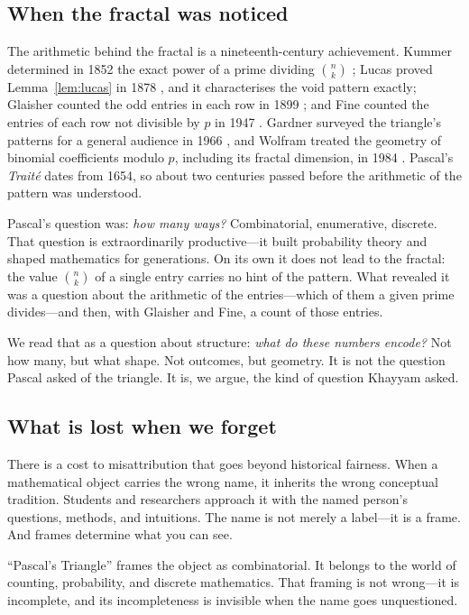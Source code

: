 \documentclass[11pt]{amsart}
\begin{document}
\subsection{When the fractal was noticed}

The arithmetic behind the fractal is a nineteenth-century achievement. Kummer determined in 1852 the exact power of a prime dividing $\binom{n}{k}$ \cite{kummer1852}; Lucas proved Lemma~\ref{lem:lucas} in 1878 \cite{lucas1878}, and it characterises the void pattern exactly; Glaisher counted the odd entries in each row in 1899 \cite{glaisher1899}; and Fine counted the entries of each row not divisible by $p$ in 1947 \cite{fine1947}. Gardner surveyed the triangle's patterns for a general audience in 1966 \cite{gardner1966}, and Wolfram treated the geometry of binomial coefficients modulo $p$, including its fractal dimension, in 1984 \cite{wolfram1984}. Pascal's \emph{Traité} dates from 1654, so about two centuries passed before the arithmetic of the pattern was understood.

Pascal's question was: \emph{how many ways?} Combinatorial, enumerative, discrete. That question is extraordinarily productive---it built probability theory and shaped mathematics for generations. On its own it does not lead to the fractal: the value $\binom{n}{k}$ of a single entry carries no hint of the pattern. What revealed it was a question about the arithmetic of the entries---which of them a given prime divides---and then, with Glaisher and Fine, a count of those entries.

We read that as a question about structure: \emph{what do these numbers encode?} Not how many, but what shape. Not outcomes, but geometry. It is not the question Pascal asked of the triangle. It is, we argue, the kind of question Khayyam asked.

\subsection{What is lost when we forget}

There is a cost to misattribution that goes beyond historical fairness. When a mathematical object carries the wrong name, it inherits the wrong conceptual tradition. Students and researchers approach it with the named person's questions, methods, and intuitions. The name is not merely a label---it is a frame. And frames determine what you can see.

``Pascal's Triangle'' frames the object as combinatorial. It belongs to the world of counting, probability, and discrete mathematics. That framing is not wrong---it is incomplete, and its incompleteness is invisible when the name goes unquestioned.
\end{document}
